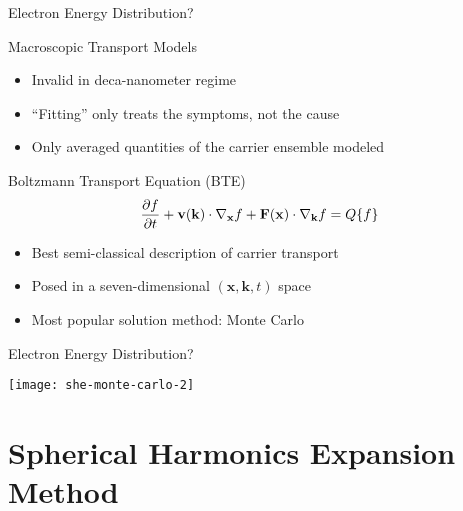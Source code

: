 \begin{frame} {Electron Energy Distribution?} 
 
  \begin{block}{Macroscopic Transport Models} 
    \begin{itemize} 
     \item Invalid in deca-nanometer regime 
     \item ``Fitting'' only treats the symptoms, not the cause 
     \item Only averaged quantities of the carrier ensemble modeled 
    \end{itemize} 
  \end{block} 
 
  \vspace*{0.5cm}
  \begin{block}{Boltzmann Transport Equation (BTE)} 
    \begin{align*} \Large 
      \frac{\partial f}{\partial t} +  \mathbf{v}(\mathbf{k}) \cdot \nabla_{\mathbf{x}} f + \mathbf F(\mathbf x) \cdot \nabla_{\mathbf k} f = Q\{f\}  
    \end{align*} 
  \vspace*{0.1cm}
 
    \begin{itemize} 
      \item Best semi-classical description of carrier transport 
      \item Posed in a seven-dimensional $(\mathbf x, \mathbf k, t)$ space 
      \item Most popular solution method: Monte Carlo 
    \end{itemize} 
  \end{block} 
  \vspace*{0.5cm}
\end{frame} 
 


\begin{frame} {Electron Energy Distribution?}
 \begin{center}
  \texttt{[image: she-monte-carlo-2]}
 \end{center}
\end{frame}
 

\section{Spherical Harmonics Expansion Method}




